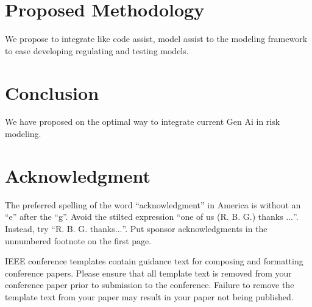 \documentclass[conference]{IEEEtran}
\begin{document}
\section{Proposed Methodology}
We propose to integrate like code assist, model assist to the modeling framework to ease developing regulating and testing models.

\section{Conclusion}

We have proposed on the optimal way to integrate current Gen Ai in risk modeling.



\section*{Acknowledgment}

The preferred spelling of the word ``acknowledgment'' in America is without 
an ``e'' after the ``g''. Avoid the stilted expression ``one of us (R. B. 
G.) thanks $\ldots$''. Instead, try ``R. B. G. thanks$\ldots$''. Put sponsor 
acknowledgments in the unnumbered footnote on the first page.





\printbibliography  %



\vspace{12pt}
\color{red}
IEEE conference templates contain guidance text for composing and formatting conference papers. Please ensure that all template text is removed from your conference paper prior to submission to the conference. Failure to remove the template text from your paper may result in your paper not being published.
\end{document}
